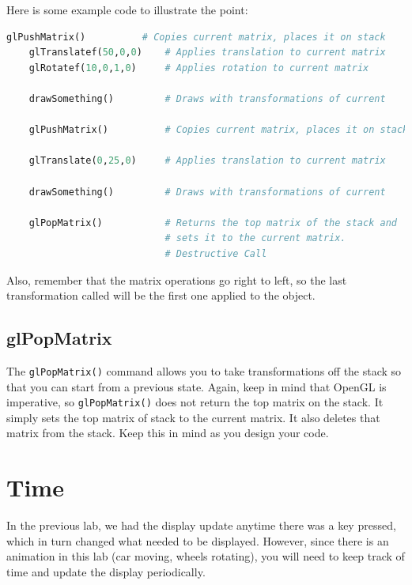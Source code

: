 \documentclass[11pt]{article}
\begin{document}
Here is some example code to illustrate the point:

    \begin{lstlisting}[language=python]
    glPushMatrix()          # Copies current matrix, places it on stack
    glTranslatef(50,0,0)    # Applies translation to current matrix
    glRotatef(10,0,1,0)     # Applies rotation to current matrix

    drawSomething()         # Draws with transformations of current

    glPushMatrix()          # Copies current matrix, places it on stack

    glTranslate(0,25,0)     # Applies translation to current matrix

    drawSomething()         # Draws with transformations of current
    
    glPopMatrix()           # Returns the top matrix of the stack and
                            # sets it to the current matrix.
                            # Destructive Call

    \end{lstlisting}

Also, remember that the matrix operations go right to left, so the last transformation called will be the first one applied to the object.

\subsection*{glPopMatrix}

The {\tt glPopMatrix()} command allows you to take transformations off the stack so that you can start from a previous state. Again, keep in mind that OpenGL is imperative, so {\tt glPopMatrix()} does not return the top matrix on the stack. It simply sets the top matrix of stack to the current matrix. It also deletes that matrix from the stack. Keep this in mind as you design your code.

\divider

\section*{Time}

In the previous lab, we had the display update anytime there was a key pressed, which in turn changed what needed to be displayed. However, since there is an animation in this lab (car moving, wheels rotating), you will need to keep track of time and update the display periodically.
\end{document}
